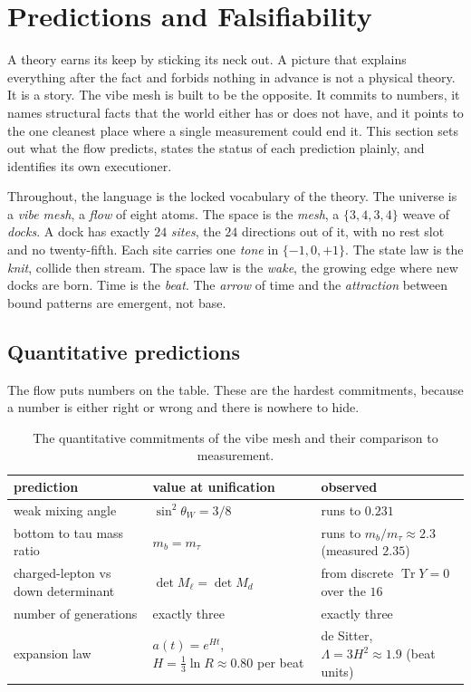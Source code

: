 \section{Predictions and Falsifiability}

A theory earns its keep by sticking its neck out. A picture that explains everything after the fact and forbids nothing in advance is not a physical theory. It is a story. The vibe mesh is built to be the opposite. It commits to numbers, it names structural facts that the world either has or does not have, and it points to the one cleanest place where a single measurement could end it. This section sets out what the flow predicts, states the status of each prediction plainly, and identifies its own executioner.

Throughout, the language is the locked vocabulary of the theory. The universe is a \emph{vibe mesh}, a \emph{flow} of eight atoms. The space is the \emph{mesh}, a $\{3,4,3,4\}$ weave of \emph{docks}. A dock has exactly $24$ \emph{sites}, the $24$ directions out of it, with no rest slot and no twenty-fifth. Each site carries one \emph{tone} in $\{-1,0,+1\}$. The state law is the \emph{knit}, collide then stream. The space law is the \emph{wake}, the growing edge where new docks are born. Time is the \emph{beat}. The \emph{arrow} of time and the \emph{attraction} between bound patterns are emergent, not base.

\subsection{Quantitative predictions}

The flow puts numbers on the table. These are the hardest commitments, because a number is either right or wrong and there is nowhere to hide.

\begin{table}[ht]
\centering
\begin{tabular}{@{}lll@{}}
\toprule
prediction & value at unification & observed \\
\midrule
weak mixing angle & $\sin^2\theta_W = 3/8$ & runs to $0.231$ \\
bottom to tau mass ratio & $m_b = m_\tau$ & runs to $m_b/m_\tau \approx 2.3$ (measured $2.35$) \\
charged-lepton vs down determinant & $\det M_{\ell} = \det M_{d}$ & from discrete $\operatorname{Tr} Y = 0$ over the $16$ \\
number of generations & exactly three & exactly three \\
expansion law & $a(t) = e^{Ht}$, $H = \tfrac{1}{3}\ln R \approx 0.80$ per beat & de Sitter, $\Lambda = 3H^2 \approx 1.9$ (beat units) \\
\bottomrule
\end{tabular}
\caption{The quantitative commitments of the vibe mesh and their comparison to measurement.}
\label{tab:quantitative-predictions}
\end{table}

